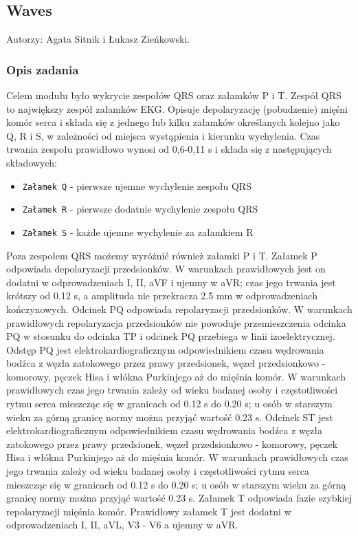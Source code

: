 \documentclass[a4paper, 11pt]{article}
\begin{document}
\subsection{Waves}
\label{sec:waves}
Autorzy: Agata Sitnik i Łukasz Zieńkowski.

\subsubsection{Opis zadania}
\label{sec:waves:desc}
Celem modułu było wykrycie zespołów QRS oraz załamków P i T.
Zespół QRS to największy zespół załamków EKG. Opisuje depolaryzację (pobudzenie) mięśni komór serca i składa się z jednego lub kilku załamków określanych kolejno jako Q, R i S, w zależności od miejsca wystąpienia i kierunku wychylenia. Czas trwania zespołu prawidłowo wynosi od 0,6-0,11 s i składa się z następujących składowych:
\begin{itemize}
     \item \verb|Załamek Q| - pierwsze ujemne wychylenie zespołu QRS
     \item \verb|Załamek R| - pierwsze dodatnie wychylenie zespołu QRS
     \item \verb|Załamek S| - każde ujemne wychylenie za załamkiem R
\end{itemize}

Poza zespołem QRS możemy wyróżnić również załamki P i T.
Załamek P odpowiada depolaryzacji przedsionków. W warunkach prawidłowych jest on dodatni w odprowadzeniach I, II, aVF i ujemny w aVR; czas jego trwania jest krótszy od 0.12 s, a amplituda nie przekracza 2.5 mm w odprowadzeniach kończynowych.
Odcinek PQ odpowiada repolaryzacji przedsionków. W warunkach prawidłowych repolaryzacja przedsionków nie powoduje przemieszczenia odcinka PQ w stosunku do odcinka TP i odcinek PQ przebiega w linii izoelektrycznej.
Odstęp PQ jest elektrokardiograficznym odpowiednikiem czasu wędrowania bodźca z węzła zatokowego
przez prawy przedsionek, węzeł przedsionkowo - komorowy, pęczek Hisa i włókna Purkinjego aż do mięśnia komór. W warunkach prawidłowych czas jego trwania zależy od wieku badanej osoby i częstotliwości rytmu serca mieszcząc się w granicach od 0.12 s do 0.20 s; u osób w starszym wieku za górną granicę normy można przyjąć wartość 0.23 s.
Odcinek ST jest elektrokardiograficznym odpowiednikiem czasu wędrowania bodźca z węzła zatokowego przez prawy przedsionek, węzeł przedsionkowo - komorowy, pęczek Hisa i włókna Purkinjego aż do mięśnia komór. W warunkach prawidłowych czas jego trwania zależy od wieku badanej osoby i częstotliwości rytmu serca mieszcząc się w granicach od 0.12 s do 0.20 s; u osób w starszym wieku za górną granicę normy można przyjąć wartość 0.23 s.
Załamek T odpowiada fazie szybkiej repolaryzacji mięśnia komór. Prawidłowy załamek T jest dodatni w odprowadzeniach I, II, aVL, V3 - V6 a ujemny w aVR.
\end{document}
